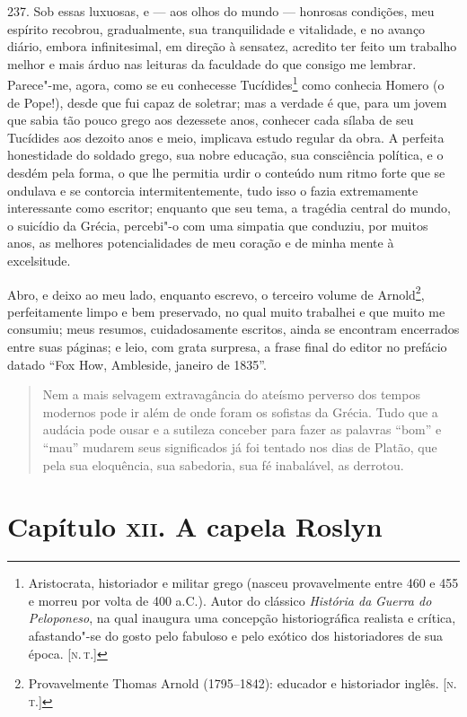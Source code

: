 237. Sob essas luxuosas, e --- aos olhos do mundo --- honrosas condições,
meu espírito recobrou, gradualmente, sua tranquilidade e vitalidade, e
no avanço diário, embora infinitesimal, em direção à sensatez, acredito
ter feito um trabalho melhor e mais árduo nas leituras da faculdade do
que consigo me lembrar. Parece"-me, agora, como se eu conhecesse
Tucídides\footnote{Aristocrata, historiador e militar grego (nasceu
  provavelmente entre 460 e 455 e morreu por volta de 400 a.C.). Autor
  do clássico \emph{História da} \emph{Guerra do Peloponeso}, na qual
  inaugura uma concepção historiográfica realista e crítica,
  afastando"-se do gosto pelo fabuloso e pelo exótico dos historiadores
  de sua época. {[}\textsc{n.\,t.}{]}} como conhecia Homero (o de Pope!), desde
que fui capaz de soletrar; mas a verdade é que, para um jovem que sabia
tão pouco grego aos dezessete anos, conhecer cada sílaba de seu
Tucídides aos dezoito anos e meio, implicava estudo regular da obra. A
perfeita honestidade do soldado grego, sua nobre educação, sua
consciência política, e o desdém pela forma, o que lhe permitia urdir o
conteúdo num ritmo forte que se ondulava e se contorcia
intermitentemente, tudo isso o fazia extremamente interessante como
escritor; enquanto que seu tema, a tragédia central do mundo, o suicídio
da Grécia, percebi"-o com uma simpatia que conduziu, por muitos anos, as
melhores potencialidades de meu coração e de minha mente à excelsitude.

Abro, e deixo ao meu lado, enquanto escrevo, o terceiro volume de
Arnold\footnote{Provavelmente Thomas Arnold (1795--1842): educador e
  historiador inglês. {[}\textsc{n.\,t.}{]}}, perfeitamente limpo e bem
preservado, no qual muito trabalhei e que muito me consumiu; meus
resumos, cuidadosamente escritos, ainda se encontram encerrados entre
suas páginas; e leio, com grata surpresa, a frase final do editor no
prefácio datado ``Fox How, Ambleside, janeiro de 1835''.

\begin{quote}
Nem a mais selvagem extravagância do ateísmo perverso dos tempos
modernos pode ir além de onde foram os sofistas da Grécia. Tudo que a
audácia pode ousar e a sutileza conceber para fazer as palavras ``bom''
e ``mau'' mudarem seus significados já foi tentado nos dias de Platão,
que pela sua eloquência, sua sabedoria, sua fé inabalável, as
derrotou.
\end{quote}

\chapter{Capítulo \textsc{xii}. A capela Roslyn}

